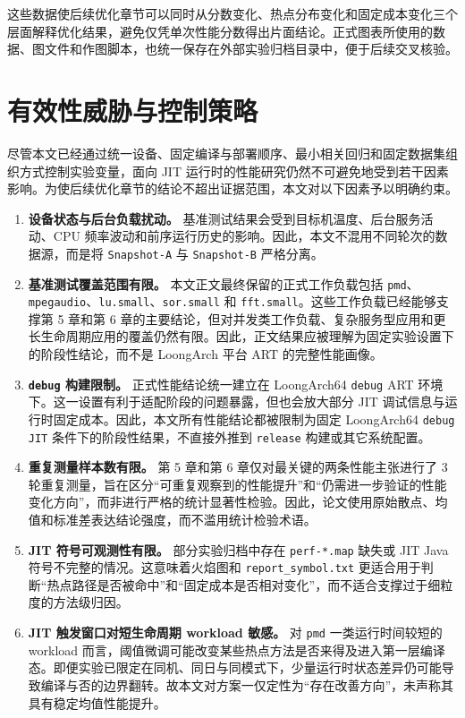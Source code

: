 这些数据使后续优化章节可以同时从分数变化、热点分布变化和固定成本变化三个层面解释优化结果，避免仅凭单次性能分数得出片面结论。正式图表所使用的数据、图文件和作图脚本，也统一保存在外部实验归档目录中，便于后续交叉核验。

\section{有效性威胁与控制策略}

尽管本文已经通过统一设备、固定编译与部署顺序、最小相关回归和固定数据集组织方式控制实验变量，面向 JIT 运行时的性能研究仍然不可避免地受到若干因素影响。为使后续优化章节的结论不超出证据范围，本文对以下因素予以明确约束。

\begin{enumerate}
    \item \textbf{设备状态与后台负载扰动。} 基准测试结果会受到目标机温度、后台服务活动、CPU 频率波动和前序运行历史的影响。因此，本文不混用不同轮次的数据源，而是将 \texttt{Snapshot-A} 与 \texttt{Snapshot-B} 严格分离。
    \item \textbf{基准测试覆盖范围有限。} 本文正文最终保留的正式工作负载包括 \texttt{pmd}、\texttt{mpegaudio}、\texttt{lu.small}、\texttt{sor.small} 和 \texttt{fft.small}。这些工作负载已经能够支撑第 5 章和第 6 章的主要结论，但对并发类工作负载、复杂服务型应用和更长生命周期应用的覆盖仍然有限。因此，正文结果应被理解为固定实验设置下的阶段性结论，而不是 LoongArch 平台 ART 的完整性能画像。
    \item \textbf{\texttt{debug} 构建限制。} 正式性能结论统一建立在 LoongArch64 \texttt{debug} ART 环境下。这一设置有利于适配阶段的问题暴露，但也会放大部分 JIT 调试信息与运行时固定成本。因此，本文所有性能结论都被限制为固定 LoongArch64 \texttt{debug JIT} 条件下的阶段性结果，不直接外推到 \texttt{release} 构建或其它系统配置。
    \item \textbf{重复测量样本数有限。} 第 5 章和第 6 章仅对最关键的两条性能主张进行了 3 轮重复测量，旨在区分“可重复观察到的性能提升”和“仍需进一步验证的性能变化方向”，而非进行严格的统计显著性检验。因此，论文使用原始散点、均值和标准差表达结论强度，而不滥用统计检验术语。
    \item \textbf{JIT 符号可观测性有限。} 部分实验归档中存在 \texttt{perf-*.map} 缺失或 JIT Java 符号不完整的情况。这意味着火焰图和 \texttt{report\_symbol.txt} 更适合用于判断“热点路径是否被命中”和“固定成本是否相对变化”，而不适合支撑过于细粒度的方法级归因。
    \item \textbf{JIT 触发窗口对短生命周期 workload 敏感。} 对 \texttt{pmd} 一类运行时间较短的 workload 而言，阈值微调可能改变某些热点方法是否来得及进入第一层编译态。即便实验已限定在同机、同日与同模式下，少量运行时状态差异仍可能导致编译与否的边界翻转。故本文对方案一仅定性为“存在改善方向”，未声称其具有稳定均值性能提升。
\end{enumerate}

